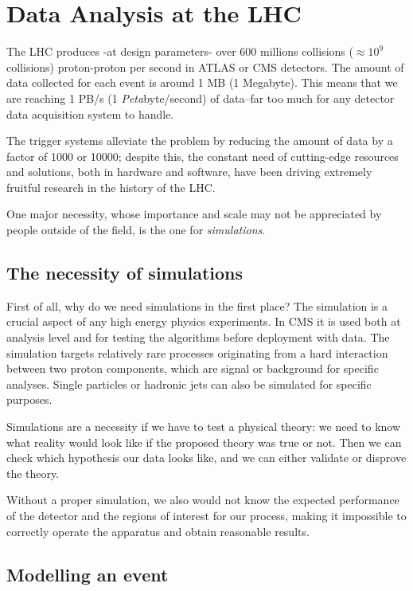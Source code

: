 \chapter{Data Analysis at the LHC}\label{ch:introduction}
The LHC produces -at design parameters- over 600 millions collisions ($\approx 10^9$ collisions) proton-proton per second in ATLAS or CMS detectors. The amount of data collected for each event is around 1 MB (1 Megabyte). This means that we are reaching 1 PB/s (1 \emph{Peta}byte/second) of data--far too much for any detector data acquisition system to handle.

The trigger systems alleviate the problem by reducing the amount of data by a factor of 1000 or 10000; despite this, the constant need of cutting-edge resources and solutions, both in hardware and software, have been driving extremely fruitful research in the history of the LHC.

One major necessity, whose importance and scale may not be appreciated by people outside of the field, is the one for \emph{simulations}.

\section{The necessity of simulations}

First of all, why do we need simulations in the first place?
The simulation is a crucial aspect of any high energy physics experiments. In CMS it is used both
at analysis level and for testing the algorithms before deployment with data. The simulation targets relatively rare processes originating from a hard interaction between two
proton components, which are signal or background for specific analyses. Single particles
or hadronic jets can also be simulated for specific purposes.

Simulations are a necessity if we have to test a physical theory: we need to know what reality would look like if the proposed theory was true or not. Then we can check which hypothesis our data looks like, and we can either validate or disprove the theory.

Without a proper simulation, we also would not know the expected performance of the detector and the regions of interest for our process, making it impossible to correctly operate the apparatus and obtain reasonable results.

\section{Modelling an event}

